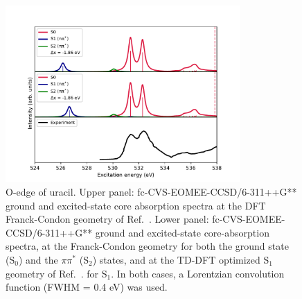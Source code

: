 \documentclass[journal=jctcce,manuscript=article]{achemso}
\begin{document}

\begin{figure}[H]
\includegraphics[width=0.8\textwidth]{Spectra/DFT_Uracil_Sn_O.pdf}
\caption{O-edge of uracil. Upper panel: fc-CVS-EOMEE-CCSD/6-311++G** ground and excited-state core absorption spectra at the DFT Franck-Condon geometry of 
Ref.~.
Lower panel: fc-CVS-EOMEE-CCSD/6-311++G** ground and excited-state core-absorption spectra, at the Franck-Condon geometry for both the ground state (S$_0$) and the $\pi\pi^*$ (S$_2$) states, and at the TD-DFT optimized S$_1$ geometry of 
Ref.~.
for S$_1$. 
In both cases, a Lorentzian convolution function (FWHM = 0.4 eV) was used.
\label{fgr:uracil:trnexafs_uracil_o:DFT}}
\end{figure}
\end{document}
